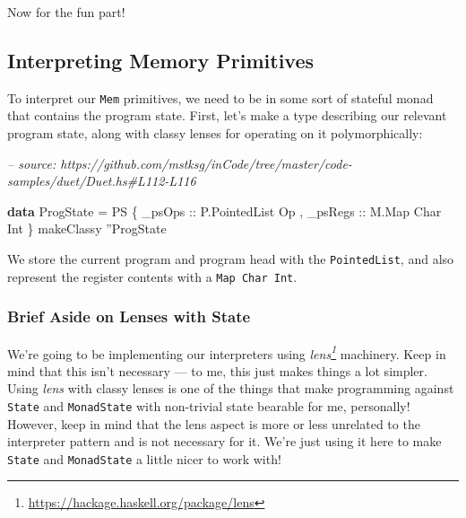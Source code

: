 \documentclass[]{article}
\newenvironment{Shaded}{}{}
\newcommand{\CommentTok}[1]{\textcolor[rgb]{0.38,0.63,0.69}{\textit{#1}}}
\newcommand{\DataTypeTok}[1]{\textcolor[rgb]{0.56,0.13,0.00}{#1}}
\newcommand{\FunctionTok}[1]{\textcolor[rgb]{0.02,0.16,0.49}{#1}}
\newcommand{\KeywordTok}[1]{\textcolor[rgb]{0.00,0.44,0.13}{\textbf{#1}}}
\newcommand{\NormalTok}[1]{#1}
\newcommand{\OtherTok}[1]{\textcolor[rgb]{0.00,0.44,0.13}{#1}}
\renewcommand{\href}[2]{#2\footnote{\url{#1}}}
\begin{document}
Now for the fun part!

\hypertarget{interpreting-memory-primitives}{%
\subsection{Interpreting Memory
Primitives}\label{interpreting-memory-primitives}}

To interpret our \texttt{Mem} primitives, we need to be in some sort of stateful
monad that contains the program state. First, let's make a type describing our
relevant program state, along with classy lenses for operating on it
polymorphically:

\begin{Shaded}
\begin{Highlighting}[]
\CommentTok{-- source: https://github.com/mstksg/inCode/tree/master/code-samples/duet/Duet.hs#L112-L116}

\KeywordTok{data} \DataTypeTok{ProgState} \FunctionTok{=} \DataTypeTok{PS}
\NormalTok{    \{}\OtherTok{ _psOps  ::} \DataTypeTok{P.PointedList} \DataTypeTok{Op}
\NormalTok{    ,}\OtherTok{ _psRegs ::} \DataTypeTok{M.Map} \DataTypeTok{Char} \DataTypeTok{Int}
\NormalTok{    \}}
\NormalTok{makeClassy ''}\DataTypeTok{ProgState}
\end{Highlighting}
\end{Shaded}

We store the current program and program head with the \texttt{PointedList}, and
also represent the register contents with a \texttt{Map\ Char\ Int}.

\hypertarget{brief-aside-on-lenses-with-state}{%
\subsubsection{Brief Aside on Lenses with
State}\label{brief-aside-on-lenses-with-state}}

We're going to be implementing our interpreters using
\emph{\href{https://hackage.haskell.org/package/lens}{lens}} machinery. Keep in
mind that this isn't necessary --- to me, this just makes things a lot simpler.
Using \emph{lens} with classy lenses is one of the things that make programming
against \texttt{State} and \texttt{MonadState} with non-trivial state bearable
for me, personally! However, keep in mind that the lens aspect is more or less
unrelated to the interpreter pattern and is not necessary for it. We're just
using it here to make \texttt{State} and \texttt{MonadState} a little nicer to
work with!
\end{document}
